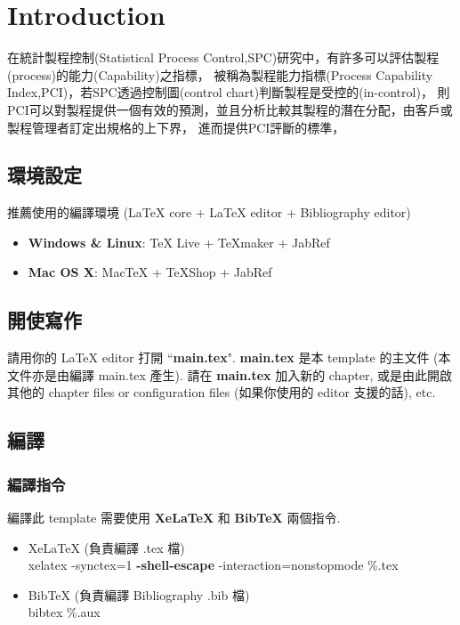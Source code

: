 \chapter{Introduction}
\label{chapter:intro}

在統計製程控制(Statistical Process Control,SPC)研究中，有許多可以評估製程(process)的能力(Capability)之指標，
被稱為製程能力指標(Process Capability Index,PCI)，若SPC透過控制圖(control chart)判斷製程是受控的(in-control)，
則PCI可以對製程提供一個有效的預測，並且分析比較其製程的潛在分配，由客戶或製程管理者訂定出規格的上下界，
進而提供PCI評斷的標準，


\section{環境設定}

推薦使用的編譯環境 (LaTeX core + LaTeX editor + Bibliography editor)

\begin{itemize}
\item \textbf{Windows \& Linux}: TeX Live + TeXmaker + JabRef
\item \textbf{Mac OS X}: MacTeX + TeXShop + JabRef
\end{itemize}

\section{開使寫作}

請用你的 LaTeX editor 打開 ``\textbf{main.tex}".
\textbf{main.tex} 是本 template 的主文件 (本文件亦是由編譯 main.tex 產生).
請在 \textbf{main.tex} 加入新的 chapter, 或是由此開啟其他的 chapter files or configuration files (如果你使用的 editor 支援的話), etc.

\section{編譯}

\subsection{編譯指令}

編譯此 template 需要使用 \textbf{XeLaTeX} 和 \textbf{BibTeX} 兩個指令.

\begin{itemize}
\item XeLaTeX (負責編譯 .tex 檔)\\
xelatex -synctex=1 \textbf{-shell-escape} -interaction=nonstopmode \%.tex
\item BibTeX (負責編譯 Bibliography .bib 檔)\\
bibtex \%.aux
\end{itemize}

